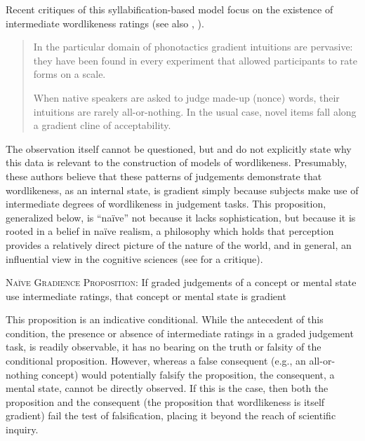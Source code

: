 Recent critiques of this syllabification-based model focus on the existence of intermediate wordlikeness ratings (see also \citealt{Coleman1997}, \citealt{Anttila2008}).

\begin{quote}
In the particular domain of phonotactics gradient intuitions are pervasive: they have been found in every experiment that allowed participants to rate forms on a scale.
\citep[][382]{Hayes2008a}

When native speakers are asked to judge made-up (nonce) words, their intuitions are rarely all-or-nothing. In the usual case, novel items fall along a gradient cline of acceptability. \citep[][9]{Albright2009a}
\end{quote}

The observation itself cannot be questioned, but \citeauthor{Hayes2008a} and \citeauthor{Albright2009a} do not explicitly state why this data is relevant to the construction of models of wordlikeness. Presumably, these authors believe that these patterns of judgements demonstrate that wordlikeness, as an internal state, is gradient simply because subjects make use of intermediate degrees of wordlikeness in judgement tasks. This proposition, generalized below, is ``naïve'' not because it lacks sophistication, but because it is rooted in a belief in naïve realism, a philosophy which holds that perception provides a relatively direct picture of the nature of the world, and in general, an influential view in the cognitive sciences (see \citealt{Fodor1981a} for a critique).

\begin{unlabeledexample}
\textsc{Naïve Gradience Proposition}: If graded judgements of a concept or mental state use intermediate ratings, that concept or mental state is gradient
\end{unlabeledexample}

This proposition is an indicative conditional. While the antecedent of this condition, the presence or absence of intermediate ratings in a graded judgement task, is readily observable, it has no bearing on the truth or falsity of the conditional proposition. However, whereas a false consequent (e.g., an all-or-nothing concept) would potentially falsify the proposition, the consequent, a mental state, cannot be directly observed. If this is the case, then both the proposition and the consequent (the proposition that wordlikeness is itself gradient) fail the test of falsification, placing it beyond the reach of scientific inquiry.

